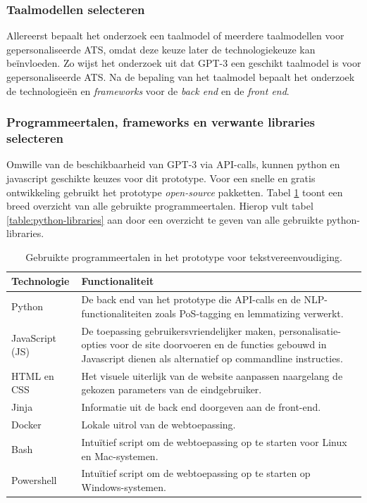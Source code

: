 \subsubsection{Taalmodellen selecteren}

Allereerst bepaalt het onderzoek een taalmodel of meerdere taalmodellen voor gepersonaliseerde ATS, omdat deze keuze later de technologiekeuze kan beïnvloeden. Zo wijst het onderzoek uit dat GPT-3 een geschikt taalmodel is voor gepersonaliseerde ATS. Na de bepaling van het taalmodel bepaalt het onderzoek de technologieën en \textit{frameworks} voor de \textit{back end} en de \textit{front end}. 

\subsubsection{Programmeertalen, frameworks en verwante libraries selecteren}

Omwille van de beschikbaarheid van GPT-3 via API-calls, kunnen python en javascript geschikte keuzes voor dit prototype. Voor een snelle en gratis ontwikkeling gebruikt het prototype \textit{open-source} pakketten. Tabel \ref{table:technologies} toont een breed overzicht van alle gebruikte programmeertalen. Hierop vult tabel \ref{table:python-libraries} aan door een overzicht te geven van alle gebruikte python-libraries.

\begin{center}
	\begin{table}[H]
	\begin{tabular}{ | m{4cm} | m{11cm} | } 
		\hline
		\textbf{Technologie} 	& \textbf{Functionaliteit} \\
		\hline
		Python 					& De back end van het prototype die API-calls en de NLP-functionaliteiten zoals PoS-tagging en lemmatizing verwerkt. \\
		\hline
		JavaScript (JS)				& De toepassing gebruikersvriendelijker maken, personalisatie-opties voor de site doorvoeren en de functies gebouwd in Javascript dienen als alternatief op commandline instructies. \\
		\hline
		HTML en CSS 			& Het visuele uiterlijk van de website aanpassen naargelang de gekozen parameters van de eindgebruiker. \\
		\hline
		Jinja 					& Informatie uit de back end doorgeven aan de front-end.  \\
		\hline
		Docker 					& Lokale uitrol van de webtoepassing. \\
		\hline
		Bash					& Intuïtief script om de webtoepassing op te starten voor Linux en Mac-systemen. \\
		\hline
		Powershell 				& Intuïtief script om de webtoepassing op te starten op Windows-systemen. \\
		\hline
	\end{tabular}
	\caption{Gebruikte programmeertalen in het prototype voor tekstvereenvoudiging.}
	\label{table:technologies}
	\end{table}
\end{center}

